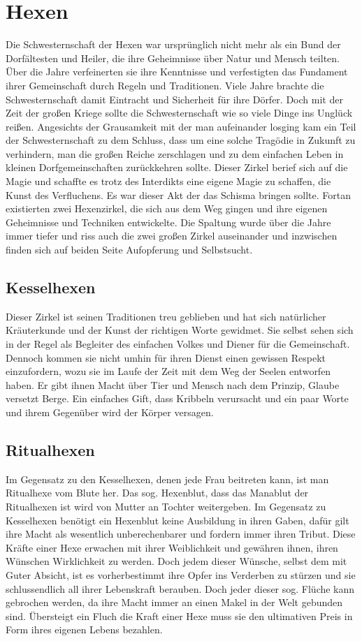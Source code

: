 \documentclass[a4paper,12pt,oneside]{book}
\begin{document}
\chapter{Hexen}
Die Schwesternschaft der Hexen war ursprünglich nicht mehr als ein Bund der Dorfältesten und Heiler, die ihre Geheimnisse über Natur und Mensch teilten. Über die Jahre verfeinerten sie ihre Kenntnisse und verfestigten das Fundament ihrer Gemeinschaft durch Regeln und Traditionen. Viele Jahre brachte die Schwesternschaft damit Eintracht und Sicherheit für ihre Dörfer. Doch mit der Zeit der großen Kriege sollte die Schwesternschaft wie so viele Dinge ins Unglück reißen. Angesichts der Grausamkeit mit der man aufeinander losging kam ein Teil der Schwesternschaft zu dem Schluss, dass um eine solche Tragödie in Zukunft zu verhindern, man die großen Reiche zerschlagen und zu dem einfachen Leben in kleinen Dorfgemeinschaften zurückkehren sollte. Dieser Zirkel berief sich auf die Magie und schaffte es trotz des Interdikts eine eigene Magie zu schaffen, die Kunst des Verfluchens. Es war dieser Akt der das Schisma bringen sollte. Fortan existierten zwei Hexenzirkel, die sich aus dem Weg gingen und ihre eigenen Geheimnisse und Techniken entwickelte. Die Spaltung wurde über die Jahre immer tiefer und riss auch die zwei großen Zirkel auseinander und inzwischen finden sich auf beiden Seite Aufopferung und Selbstsucht.   
\section{Kesselhexen}
Dieser Zirkel ist seinen Traditionen treu geblieben und hat sich natürlicher Kräuterkunde und der Kunst der richtigen Worte gewidmet. Sie selbst sehen sich in der Regel als Begleiter des einfachen Volkes und Diener für die Gemeinschaft. Dennoch kommen sie nicht umhin für ihren Dienst einen gewissen Respekt einzufordern, wozu sie im Laufe der Zeit mit dem Weg der Seelen entworfen haben. Er gibt ihnen Macht über Tier und Mensch nach dem Prinzip, Glaube versetzt Berge. Ein einfaches Gift, dass Kribbeln verursacht und ein paar Worte und ihrem Gegenüber wird der Körper versagen.
\section{Ritualhexen}
Im Gegensatz zu den Kesselhexen, denen jede Frau beitreten kann, ist man Ritualhexe vom Blute her. Das sog. Hexenblut, dass das Manablut der Ritualhexen ist wird von Mutter an Tochter weitergeben. Im Gegensatz zu Kesselhexen benötigt ein Hexenblut keine Ausbildung in ihren Gaben, dafür gilt ihre Macht als wesentlich unberechenbarer und fordern immer ihren Tribut. Diese Kräfte einer Hexe erwachen mit ihrer Weiblichkeit und gewähren ihnen, ihren Wünschen Wirklichkeit zu werden. Doch jedem dieser Wünsche, selbst dem mit Guter Absicht, ist es vorherbestimmt ihre Opfer ins Verderben zu stürzen und sie schlussendlich all ihrer Lebenskraft berauben. Doch jeder dieser sog. Flüche kann gebrochen werden, da ihre Macht immer an einen Makel in der Welt gebunden sind. Übersteigt ein Fluch die Kraft einer Hexe muss sie den ultimativen Preis in Form ihres eigenen Lebens bezahlen.    
\end{document}
